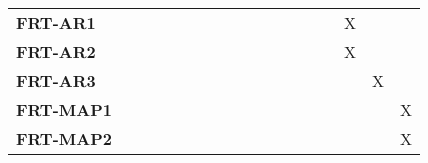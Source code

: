 \documentclass[12pt, titlepage]{article}
\begin{document}
\begin{landscape}
\begin{longtable}{|l|cccccccccccc|}
		\textbf{FRT-AR1} & ~                                                         & ~             & ~             & ~             & ~             & ~             & ~             & ~             & ~             & X             & ~ &~\\
		\textbf{FRT-AR2} & ~                                                         & ~             & ~             & ~             & ~             & ~             & ~             & ~             & ~             & X             & ~ &~\\
		\textbf{FRT-AR3} & ~                                                         & ~             & ~             & ~             & ~             & ~             & ~             & ~             & ~             & ~             & X &~\\
		\textbf{FRT-MAP1} & ~                                                         & ~             & ~             & ~             & ~             & ~             & ~             & ~             & ~             & ~             & ~ &X\\
		\textbf{FRT-MAP2} & ~                                                         & ~             & ~             & ~             & ~             & ~             & ~             & ~             & ~             & ~             & ~ &X\\
		\hline
	\end{longtable}

	\newpage
	

\end{landscape}
\end{document}
